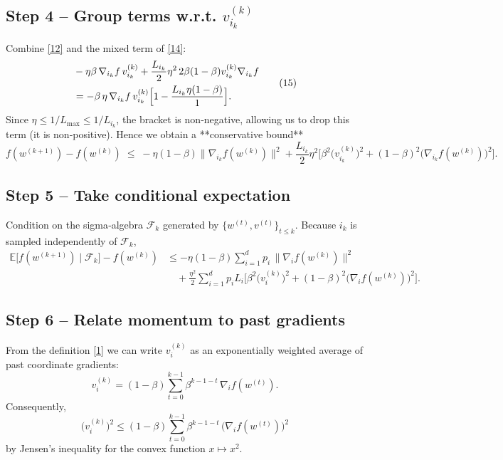 \documentclass{article}
\newcommand{\E}{\mathbb{E}}
\begin{document}
\subsection*{Step 4 – Group terms w.r.t. $v_{i_k}^{(k)}$}
Combine \eqref{12} and the mixed term of \eqref{14}:
\[
\begin{aligned}
    &-\eta\beta\,\nabla_{i_k}f\,v_{i_k}^{(k)}
    +\frac{L_{i_k}}{2}\eta^{2}\,2\beta(1-\beta)v_{i_k}^{(k)}\nabla_{i_k}f \\
    &= -\beta\,\eta\,\nabla_{i_k}f\,v_{i_k}^{(k)}
       \Bigl[1-\frac{L_{i_k}\eta(1-\beta)}{1}\Bigr].
\end{aligned}
\tag{15}
\]
Since $\eta\le 1/L_{\max}\le 1/L_{i_k}$, the bracket is non‑negative, allowing us to
drop this term (it is non‑positive).  Hence we obtain a **conservative bound**
\[
    f(w^{(k+1)})-f(w^{(k)})\;\le\;
    -\eta(1-\beta)\|\nabla_{i_k}f(w^{(k)})\|^{2}
    +\frac{L_{i_k}}{2}\eta^{2}\Big[
        \beta^{2}\bigl(v_{i_k}^{(k)}\bigr)^{2}
        +(1-\beta)^{2}\bigl(\nabla_{i_k}f(w^{(k)})\bigr)^{2}
      \Big].
\tag{16}
\]

\subsection*{Step 5 – Take conditional expectation}
Condition on the sigma‑algebra $\mathcal{F}_k$ generated by $\{w^{(t)},v^{(t)}\}_{t\le k}$.
Because $i_k$ is sampled independently of $\mathcal{F}_k$,
\[
\begin{aligned}
    \E\!\bigl[f(w^{(k+1)})\mid\mathcal{F}_k\bigr]-f(w^{(k)})
    &\le -\eta(1-\beta)\sum_{i=1}^{d}p_i\,\|\nabla_i f(w^{(k)})\|^{2}\\
    &\quad +\frac{\eta^{2}}{2}\sum_{i=1}^{d}p_i L_i
        \Big[ \beta^{2}\bigl(v_i^{(k)}\bigr)^{2}
              +(1-\beta)^{2}\bigl(\nabla_i f(w^{(k)})\bigr)^{2}\Big].
\end{aligned}
\tag{17}
\]

\subsection*{Step 6 – Relate momentum to past gradients}
From the definition \eqref{1} we can write $v_i^{(k)}$ as an exponentially weighted
average of past coordinate gradients:
\[
    v_i^{(k)} = (1-\beta)\sum_{t=0}^{k-1}\beta^{k-1-t}\,\nabla_i f(w^{(t)}).
\tag{18}
\]
Consequently,
\[
    \bigl(v_i^{(k)}\bigr)^{2}
    \le (1-\beta)\sum_{t=0}^{k-1}\beta^{k-1-t}\,
        \bigl(\nabla_i f(w^{(t)})\bigr)^{2}
\tag{19}
\]
by Jensen’s inequality for the convex function $x\mapsto x^{2}$.
\end{document}
